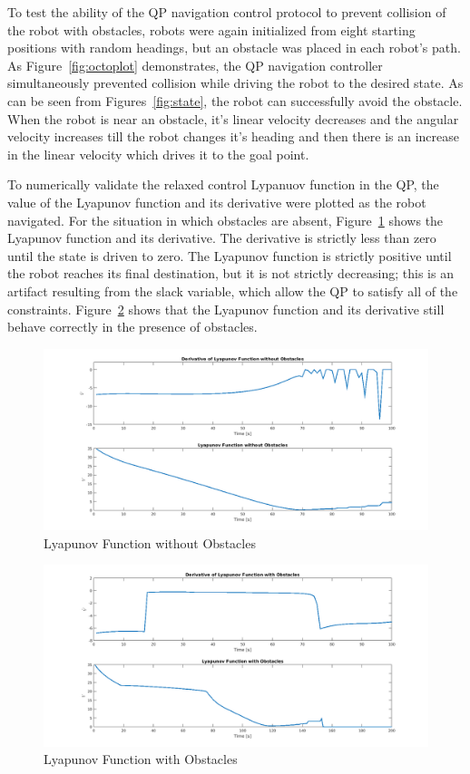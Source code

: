\documentclass[journal]{IEEEconf}
\begin{document}
To test the ability of the QP navigation control protocol to prevent collision of the robot with obstacles, robots were again initialized from eight starting positions with random headings, but an obstacle was placed in each robot's path. As Figure~\ref{fig:octoplot} demonstrates, the QP navigation controller simultaneously prevented collision while driving the robot to the desired state.
As can be seen from Figures~\ref{fig:state}, the robot can successfully avoid the obstacle. When the robot is near an obstacle, it's linear velocity decreases and the angular velocity increases till the robot changes it's heading and then there is an increase in the linear velocity which drives it to the goal point.

To numerically validate the relaxed control Lypanuov function in the QP, the value of the Lyapunov function and its derivative were plotted as the robot navigated. For the situation in which obstacles are absent, Figure~\ref{fig:lyapunovsans} shows the Lyapunov function and its derivative. The derivative is strictly less than zero until the state is driven to zero. The Lyapunov function is strictly positive until the robot reaches its final destination, but it is not strictly decreasing; this is an artifact resulting from the slack variable, which allow the QP to satisfy all of the constraints. Figure~\ref{fig:lyapunov} shows that the Lyapunov function and its derivative still behave correctly in the presence of obstacles.

\begin{figure}[h!]
\centering
\includegraphics[scale=0.2]{lyapunovsans.png} 
\caption{Lyapunov Function without Obstacles\label{fig:lyapunovsans}} 
\end{figure}

\begin{figure}[h!]
\centering
\includegraphics[scale=0.2]{lyapunov.png} 
\caption{Lyapunov Function with Obstacles\label{fig:lyapunov}} 
\end{figure}
\end{document}
